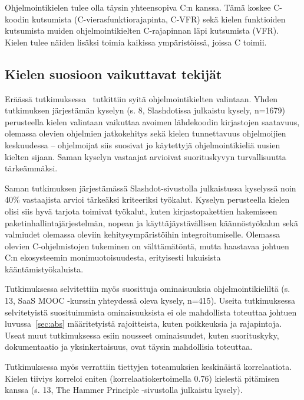 Ohjelmointikielen tulee olla täysin yhteensopiva C:n kanssa. Tämä koskee
C-koodin kutsumista (C-vie\-ras\-funk\-tio\-ra\-ja\-pin\-ta, C-VFR) sekä kielen funktioiden kutsumista muiden
ohjelmointikielten C-rajapinnan läpi kutsumista (VFR). Kielen tulee näiden
lisäksi toimia kaikissa ympäristöissä, joissa C toimii.

\subsection{Kielen suosioon vaikuttavat tekijät}

Eräässä tutkimuksessa~\citep{empiricalpopularity} tutkittiin syitä
ohjelmointikielten valintaan. Yhden tutkimuksen järjestämän kyselyn (s. 8,
\mbox{Slashdotissa} julkaistu kysely, n=1679) perusteella kielen valintaan
vaikuttaa avoimen lähdekoodin kirjastojen saatavuus, olemassa olevien ohjelmien
jatkokehitys sekä kielen tunnettavuus ohjelmoijien keskuudessa -- ohjelmoijat
siis suosivat jo käytettyjä ohjelmointikieliä uusien kielten sijaan. Saman
kyselyn vastaajat arvioivat suorituskyvyn turvallisuutta tärkeämmäksi.

Saman tutkimuksen järjestämässä Slashdot-sivustolla julkaistussa kyselyssä noin
40\% vastaajista arvioi tärkeäksi kriteeriksi työkalut. Kyselyn perusteella
kielen olisi siis hyvä tarjota toimivat työkalut, kuten kirjastopakettien
hakemiseen paketinhallintajärjestelmän, nopean ja
käyttäjäystävällisen käännöstyökalun sekä valmiudet olemassa oleviin
kehitysympäristöihin integroitumiselle. Olemassa olevien C-ohjelmistojen
tukeminen on välttämätöntä, mutta haastavaa johtuen C:n ekosysteemin
monimuotoisuudesta, erityisesti lukuisista kääntämistyökaluista.

Tutkimuksessa selvitettiin myös suosittuja ominaisuuksia ohjelmointikieliltä
(s. 13, SaaS MOOC -kurssin yhteydessä oleva kysely, n=415). Useita
tutkimuksessa selvitetyistä suosituimmista ominaisuuksista ei ole mahdollista
toteuttaa johtuen luvussa~\ref{sec:abs} määritetyistä rajoitteista, kuten
poikkeuksia ja rajapintoja. Useat muut tutkimuksessa esiin nousseet
ominaisuudet, kuten suorituskyky, dokumentaatio ja yksinkertaisuus, ovat täysin
mahdollisia toteuttaa.

Tutkimuksessa myös verrattiin tiettyjen toteamuksien keskinäistä korrelaatiota.
Kielen tiiviys korreloi eniten (korrelaatiokertoimella 0.76) kielestä pitämisen
kanssa (s. 13, The Hammer Principle -sivustolla julkaistu kysely).

